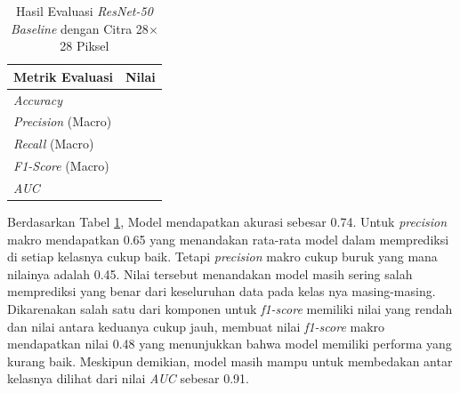 
\begin{table}[H]
    \centering
    \caption{Hasil Evaluasi \textit{ResNet-50 Baseline} dengan Citra 28$\times$28 Piksel}
    \label{tab:hasil_resnet50baseline_28}
    \begin{tabular}{>{\raggedright\arraybackslash}m{} 
                    >{\centering\arraybackslash}m{}}
        \toprule
        \textbf{Metrik Evaluasi} & \textbf{Nilai} \\
        \midrule
        \textit{Accuracy} & 0.74 \\
        \textit{Precision} (Macro) & 0.65 \\
        \textit{Recall} (Macro) & 0.45 \\
        \textit{F1-Score} (Macro) & 0.48 \\
        \textit{AUC} & 0.91 \\
        \bottomrule
    \end{tabular}
\end{table}

Berdasarkan Tabel \ref{tab:hasil_resnet50baseline_28}, Model mendapatkan 
akurasi sebesar 0.74. Untuk \textit{precision} makro mendapatkan 0.65 
yang menandakan rata-rata model dalam memprediksi di setiap kelasnya 
cukup baik. Tetapi \textit{precision} makro cukup buruk yang mana nilainya 
adalah 0.45. Nilai tersebut menandakan model masih sering salah memprediksi 
yang benar dari keseluruhan data pada kelas nya masing-masing. Dikarenakan 
salah satu dari komponen untuk \textit{f1-score} memiliki nilai yang rendah 
dan nilai antara keduanya cukup jauh, membuat nilai \textit{f1-score} makro 
mendapatkan nilai 0.48 yang menunjukkan bahwa model memiliki performa yang 
kurang baik. Meskipun demikian, model masih mampu untuk membedakan antar kelasnya 
dilihat dari nilai \textit{AUC} sebesar 0.91. \par

